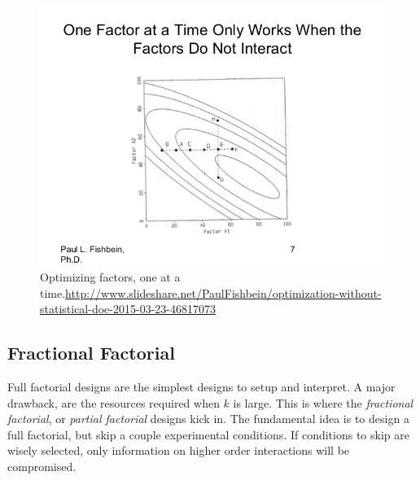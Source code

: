 \begin{figure}[ht]
\centering
\includegraphics[height=0.3\textheight]{art/optimization-without-statistical-doe-2015-03-23-7-638}
\caption[One-at-a-time optimization]{Optimizing factors, one at a time.\newline \url{http://www.slideshare.net/PaulFishbein/optimization-without-statistical-doe-2015-03-23-46817073}}
\label{fig:one_factor_at_a_time}
\end{figure}





\subsection{Fractional Factorial}
Full factorial designs are the simplest designs to setup and interpret. 
A major drawback, are the resources required when $k$ is large. 
This is where the \emph{fractional factorial}, or \emph{partial factorial} designs kick in.
The fundamental idea is to design a full factorial, but skip a couple experimental conditions. If conditions to skip are wisely selected, only information on higher order interactions will be compromised.



